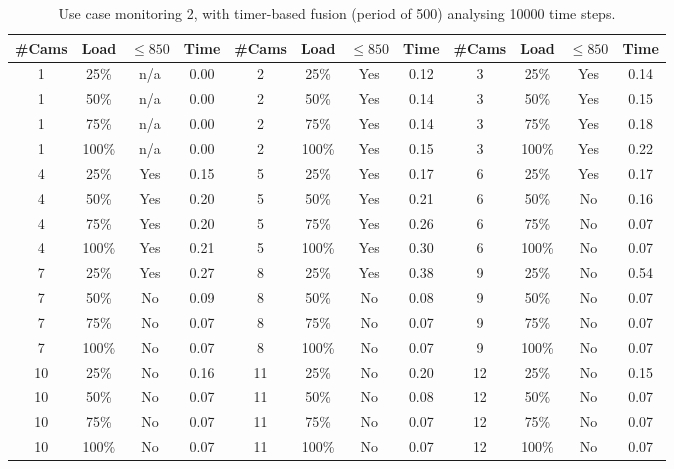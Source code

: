 \documentclass{article}
\begin{document}
\begin{table}
\centering
\begin{tabular}{|c|c|c|c|c|c|c|c|c|c|c|c|}
\hline
\#Cams & Load & $\leq 850$ & Time & \#Cams & Load & $\leq 850$ & Time & \#Cams & Load & $\leq 850$ & Time\\
\hline
1 & 25\% & n/a & 0.00 & 2 & 25\% & Yes & 0.12 & 3 & 25\% & Yes & 0.14\\
1 & 50\% & n/a & 0.00 & 2 & 50\% & Yes & 0.14 & 3 & 50\% & Yes & 0.15\\
1 & 75\% & n/a & 0.00 & 2 & 75\% & Yes & 0.14 & 3 & 75\% & Yes & 0.18\\
1 & 100\% & n/a & 0.00 & 2 & 100\% & Yes & 0.15 & 3 & 100\% & Yes & 0.22\\
\hline
4 & 25\% & Yes & 0.15 & 5 & 25\% & Yes & 0.17 & 6 & 25\% & Yes & 0.17\\
4 & 50\% & Yes & 0.20 & 5 & 50\% & Yes & 0.21 & 6 & 50\% & No & 0.16\\
4 & 75\% & Yes & 0.20 & 5 & 75\% & Yes & 0.26 & 6 & 75\% & No & 0.07\\
4 & 100\% & Yes & 0.21 & 5 & 100\% & Yes & 0.30 & 6 & 100\% & No & 0.07\\
\hline
7 & 25\% & Yes & 0.27 & 8 & 25\% & Yes & 0.38 & 9 & 25\% & No & 0.54\\
7 & 50\% & No & 0.09 & 8 & 50\% & No & 0.08 & 9 & 50\% & No & 0.07\\
7 & 75\% & No & 0.07 & 8 & 75\% & No & 0.07 & 9 & 75\% & No & 0.07\\
7 & 100\% & No & 0.07 & 8 & 100\% & No & 0.07 & 9 & 100\% & No & 0.07\\
\hline
10 & 25\% & No & 0.16 & 11 & 25\% & No & 0.20 & 12 & 25\% & No & 0.15\\
10 & 50\% & No & 0.07 & 11 & 50\% & No & 0.08 & 12 & 50\% & No & 0.07\\
10 & 75\% & No & 0.07 & 11 & 75\% & No & 0.07 & 12 & 75\% & No & 0.07\\
10 & 100\% & No & 0.07 & 11 & 100\% & No & 0.07 & 12 & 100\% & No & 0.07\\
\hline
\end{tabular}
\caption{Use case monitoring 2, with timer-based fusion (period of 500) analysing 10000 time steps.}
\end{table}
\end{document}
